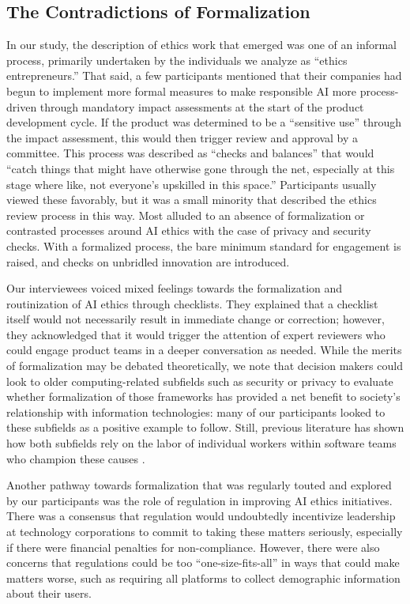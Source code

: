 \documentclass[sigconf]{acmart}
\begin{document}
\subsection{The Contradictions of Formalization}

In our study, the description of ethics work that emerged was one of an informal process, primarily undertaken by the individuals we analyze as “ethics entrepreneurs.” That said, a few participants mentioned that their companies had begun to implement more formal measures to make responsible AI more process-driven through mandatory impact assessments at the start of the product development cycle. If the product was determined to be a “sensitive use” through the impact assessment, this would then trigger review and approval by a committee. This process was described as “checks and balances” that would “catch things that might have otherwise gone through the net, especially at this stage where like, not everyone’s upskilled in this space.” Participants usually viewed these favorably, but it was a small minority that described the ethics review process in this way. Most alluded to an absence of formalization or contrasted processes around AI ethics with the case of privacy and security checks. With a formalized process, the bare minimum standard for engagement is raised, and checks on unbridled innovation are introduced. 

Our interviewees voiced mixed feelings towards the formalization and routinization of AI ethics through checklists. They explained that a checklist itself would not necessarily result in immediate change or correction; however, they acknowledged that it would trigger the attention of expert reviewers who could engage product teams in a deeper conversation as needed. While the merits of formalization may be debated theoretically, we note that decision makers could look to older computing-related subfields such as security or privacy to evaluate whether formalization of those frameworks has provided a net benefit to society’s relationship with information technologies: many of our participants looked to these subfields as a positive example to follow. Still, previous literature has shown how both subfields rely on the labor of individual workers within software teams who champion these causes \cite{tondel_security_2020, haney_cybersecurity_2018, tahaei_privacy_2021}.

Another pathway towards formalization that was regularly touted and explored by our participants was the role of regulation in improving AI ethics initiatives. There was a consensus that regulation would undoubtedly incentivize leadership at technology corporations to commit to taking these matters seriously, especially if there were financial penalties for non-compliance. However, there were also concerns that regulations could be too “one-size-fits-all” in ways that could make matters worse, such as requiring all platforms to collect demographic information about their users. 
 
\end{document}
